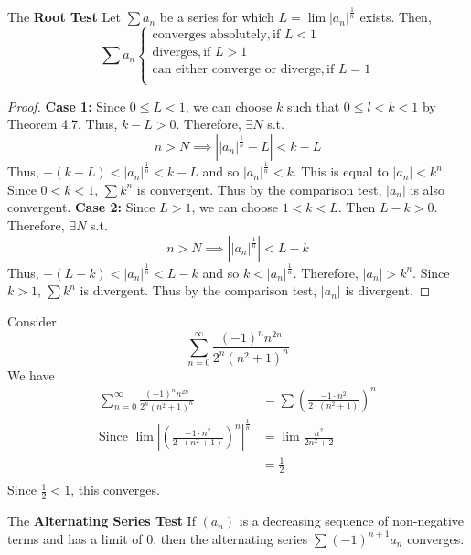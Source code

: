\documentclass{article}
\begin{document}
\begin{cthm}[Theorem 14.9] The \textbf{Root Test}\newline
Let $\sum a_n$ be a series for which $L = \lim |a_n|^\frac{1}{n}$ exists. Then,\[\sum a_n
\begin{cases}
    \text{converges absolutely},    \text{if $L < 1$}\\
    \text{diverges},    \text{if $L > 1$}\\
    \text{can either converge or diverge},    \text{if $L = 1$}\\
\end{cases}
\]
\end{cthm}
\begin{proof}
\textbf{Case 1:}\newline
Since $0 \leq L < 1$,  we can choose $k$ such that $0 \leq l < k < 1$ by Theorem 4.7. Thus, $k-L >0$. Therefore, $\exists N$ s.t. \[n > N \implies \left| |a_n|^\frac{1}{n} - L \right| < k - L\]
Thus, $-(k-L) < |a_n|^\frac{1}{n} < k - L $ and so $|a_n|^\frac{1}{n} < k$. This is equal to $|a_n| < k^n$. Since $0 < k < 1$, $\sum k^n$ is convergent. Thus by the comparison test, $|a_n|$ is also convergent.\newline
\textbf{Case 2:}\newline
Since $L > 1$, we can choose $1 < k < L$. Then $L - k > 0$.
Therefore, $\exists N$ s.t. \[n > N \implies \left| |a_n|^\frac{1}{n} \right| < L-k\]
Thus, $-(L-k) < |a_n|^\frac{1}{n} < L-k $ and so $k < |a_n|^\frac{1}{n}$. Therefore, $|a_{n}| > k^n$. Since $k > 1$, $\sum k^n$ is divergent. Thus by the comparison test, $|a_n|$ is divergent.
\end{proof}
\begin{example}
Consider \[\sum_{n=0}^\infty \frac{(-1)^n n^{2n}}{2^n (n^2+1)^n}\]
We have
\begin{align*}
    \sum_{n=0}^\infty \frac{(-1)^n n^{2n}}{2^n (n^2+1)^n}&= \sum \left(\frac{-1 \cdot n^2}{2 \cdot (n^2+1)}\right)^n\\
    \text{Since } \lim \left|\left(\frac{-1 \cdot n^2}{2 \cdot (n^2+1)}\right)^n\right|^\frac{1}{n} &= \lim \frac{n^2}{2n^2+2}\\
    &= \frac{1}{2}\\
\end{align*}
Since $\frac{1}{2} < 1$, this converges.
\end{example}
\begin{cthm}[Theorem 15.3]
The \textbf{Alternating Series Test} \newline
If $(a_n)$ is a decreasing sequence of non-negative terms and has a limit of $0$, then the alternating series $\sum (-1)^{n+1} a_n$ converges.
\end{cthm}
\end{document}
